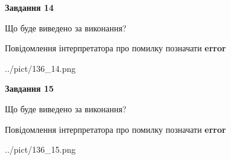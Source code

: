 \documentclass[11pt, ukrainian]{article}
\begin{document}
{\begin {large}
{\begin {center}\textbf{Завдання 14}\end {center}}\par
Що буде виведено за виконання? \par
Повідомлення інтерпретатора про помилку позначати \textbf{error}

\begin{center}
	{../pict/136_14.png}
\end{center}
\newpage

{\begin {center}\textbf{Завдання 15}\end {center}}\par
Що буде виведено за виконання? \par
Повідомлення інтерпретатора про помилку позначати \textbf{error}

\begin{center}
	{../pict/136_15.png}
\end{center}
\newpage

\end {large}}
\end{document}
